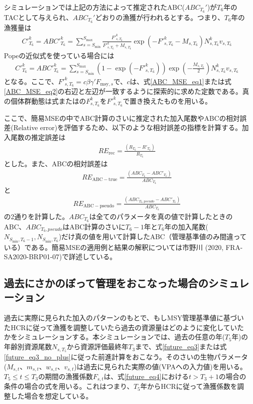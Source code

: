 \documentclass[11pt]{jsarticle}
\begin{document}
シミュレーションでは上記の方法によって推定されたABC($ABC_{T_6}'$)が$T_6$年のTACとして与えられ、$ABC_{T_6}'$どおりの漁獲が行われるとする。つまり、$T_6$年の漁獲量は
\begin{eqnarray}
  {C'}_{T_6}^{k}={ABC'}_{T_6}^{k}=\sum_{s=S_{\mathrm{min}}}^{S_{\mathrm{max}}} \frac{{F'}_{s,T_6}^k}{{F'}_{s,T_6}^k+M_{s,T_6}}
  \exp(- {F'}_{s,T_6}^k - M_{s,T_6}) N_{s,T_6}^k v_{s,T_6}
\label{ABC_MSE_eq1}
\end{eqnarray}
Popeの近似式を使っている場合には
\begin{eqnarray}
  {C'}_{T_6}^k={ABC'}_{T_6}^{k}=\sum_{s=S_{\mathrm{min}}}^{S_{\mathrm{max}}} (1-\exp(- {F'}_{s,T_6}^k)) \exp(-\frac{M_{s,T_6}}{2}) N_{s,T_6}^k v_{s,T_6}
\label{ABC_MSE_eq2}
\end{eqnarray}
となる。ここで、${F'}_{s,T_6}^k=c \beta \gamma' F_{\mathrm{msy},s}$で、$c$は、式\ref{ABC_MSE_eq1}または式\ref{ABC_MSE_eq2}の右辺と左辺が一致するように探索的に求めた定数である。真の個体群動態は式\label{future_eq3}または\label{future_eq3_no_plus}の$F_{s,T_6}^k$を${F'}_{s,T_6}^k$で置き換えたものを用いる。

ここで、簡易MSEの中でABC計算のさいに推定された加入尾数やABCの相対誤差(Relative error)を評価するため、以下のような相対誤差の指標を計算する。加入尾数の推定誤差は
\begin{eqnarray}
  R\!E_{\mathrm{rec}} = \frac{(R_{T_6}-R'_{T_6})}{R_{T_6}}
\label{RE1}
\end{eqnarray}
とした。また、ABCの相対誤差は
\begin{eqnarray}
  R\!E_{\mathrm{ABC-true}} = \frac{(ABC_{T_6}-ABC'_{T_6})}{ABC_{T_6}}
\end{eqnarray}
と
\begin{eqnarray}
  R\!E_{\mathrm{ABC-pseudo}} = \frac{(ABC_{T_6, pseudo}-ABC'_{T_6})}{ABC_{T_6}}
\end{eqnarray}
の2通りを計算した。$ABC_{T_6}$は全てのパラメータを真の値で計算したときのABC、$ABC_{T_6, pseudo}$はABC計算のさいに$T_6-1$年と$T_6$年の加入尾数($N_{S_{\mathrm{min}},T_6 -1}, N_{S_{\mathrm{min}},T_6}$)だけ真の値を用いて計算したABC（管理基準値のみ間違っている）である。簡易MSEの適用例と結果の解釈については市野川 (2020, FRA-SA2020-BRP01-07)で詳述している。

\subsection{過去にさかのぼって管理をおこなった場合のシミュレーション\label{sec:whatif}}

過去に実際に見られた加入のパターンのもとで、もしMSY管理基準値に基づいたHCRに従って漁獲を調整していたら過去の資源量はどのように変化していたかをシミュレーションする。本シミュレーションでは、過去の任意の年($T_5$年)の年齢別資源尾数$N_{s,T_5}$から資源評価最終年$T_3$まで、式\ref{future_eq3}または式\ref{future_eq3_no_plus}に従った前進計算をおこなう。そのさいの生物パラメータ($M_{s,t}$、$m_{s,t}$、$w_{s,t}$、$v_{s,t}$)は過去に見られた実際の値(VPAへの入力値)を用いる。$T_5 \leq t \leq T_3$の期間の漁獲係数$F_{s,t}$は、式\ref{future_eq4}における$t > T_3+1$の場合の条件の場合の式を用いる。これはつまり、$T_5$年からHCRに従って漁獲係数を調整した場合を想定している。
\end{document}

